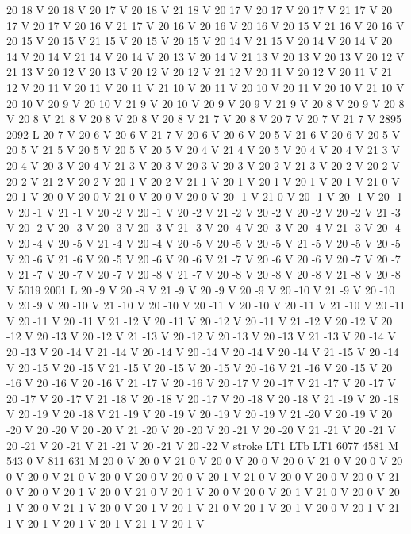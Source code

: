 {{20 18 V
20 18 V
20 17 V
20 18 V
21 18 V
20 17 V
20 17 V
20 17 V
21 17 V
20 17 V
20 17 V
20 16 V
21 17 V
20 16 V
20 16 V
20 16 V
20 15 V
21 16 V
20 16 V
20 15 V
20 15 V
21 15 V
20 15 V
20 15 V
20 14 V
21 15 V
20 14 V
20 14 V
20 14 V
20 14 V
21 14 V
20 14 V
20 13 V
20 14 V
21 13 V
20 13 V
20 13 V
20 12 V
21 13 V
20 12 V
20 13 V
20 12 V
20 12 V
21 12 V
20 11 V
20 12 V
20 11 V
21 12 V
20 11 V
20 11 V
20 11 V
21 10 V
20 11 V
20 10 V
20 11 V
20 10 V
21 10 V
20 10 V
20 9 V
20 10 V
21 9 V
20 10 V
20 9 V
20 9 V
21 9 V
20 8 V
20 9 V
20 8 V
20 8 V
21 8 V
20 8 V
20 8 V
20 8 V
21 7 V
20 8 V
20 7 V
20 7 V
21 7 V
2895 2092 L
20 7 V
20 6 V
20 6 V
21 7 V
20 6 V
20 6 V
20 5 V
21 6 V
20 6 V
20 5 V
20 5 V
21 5 V
20 5 V
20 5 V
20 5 V
20 4 V
21 4 V
20 5 V
20 4 V
20 4 V
21 3 V
20 4 V
20 3 V
20 4 V
21 3 V
20 3 V
20 3 V
20 3 V
20 2 V
21 3 V
20 2 V
20 2 V
20 2 V
21 2 V
20 2 V
20 1 V
20 2 V
21 1 V
20 1 V
20 1 V
20 1 V
20 1 V
21 0 V
20 1 V
20 0 V
20 0 V
21 0 V
20 0 V
20 0 V
20 -1 V
21 0 V
20 -1 V
20 -1 V
20 -1 V
20 -1 V
21 -1 V
20 -2 V
20 -1 V
20 -2 V
21 -2 V
20 -2 V
20 -2 V
20 -2 V
21 -3 V
20 -2 V
20 -3 V
20 -3 V
20 -3 V
21 -3 V
20 -4 V
20 -3 V
20 -4 V
21 -3 V
20 -4 V
20 -4 V
20 -5 V
21 -4 V
20 -4 V
20 -5 V
20 -5 V
20 -5 V
21 -5 V
20 -5 V
20 -5 V
20 -6 V
21 -6 V
20 -5 V
20 -6 V
20 -6 V
21 -7 V
20 -6 V
20 -6 V
20 -7 V
20 -7 V
21 -7 V
20 -7 V
20 -7 V
20 -8 V
21 -7 V
20 -8 V
20 -8 V
20 -8 V
21 -8 V
20 -8 V
5019 2001 L
20 -9 V
20 -8 V
21 -9 V
20 -9 V
20 -9 V
20 -10 V
21 -9 V
20 -10 V
20 -9 V
20 -10 V
21 -10 V
20 -10 V
20 -11 V
20 -10 V
20 -11 V
21 -10 V
20 -11 V
20 -11 V
20 -11 V
21 -12 V
20 -11 V
20 -12 V
20 -11 V
21 -12 V
20 -12 V
20 -12 V
20 -13 V
20 -12 V
21 -13 V
20 -12 V
20 -13 V
20 -13 V
21 -13 V
20 -14 V
20 -13 V
20 -14 V
21 -14 V
20 -14 V
20 -14 V
20 -14 V
20 -14 V
21 -15 V
20 -14 V
20 -15 V
20 -15 V
21 -15 V
20 -15 V
20 -15 V
20 -16 V
21 -16 V
20 -15 V
20 -16 V
20 -16 V
20 -16 V
21 -17 V
20 -16 V
20 -17 V
20 -17 V
21 -17 V
20 -17 V
20 -17 V
20 -17 V
21 -18 V
20 -18 V
20 -17 V
20 -18 V
20 -18 V
21 -19 V
20 -18 V
20 -19 V
20 -18 V
21 -19 V
20 -19 V
20 -19 V
20 -19 V
21 -20 V
20 -19 V
20 -20 V
20 -20 V
20 -20 V
21 -20 V
20 -20 V
20 -21 V
20 -20 V
21 -21 V
20 -21 V
20 -21 V
20 -21 V
21 -21 V
20 -21 V
20 -22 V
stroke
LT1
LTb
LT1
6077 4581 M
543 0 V
811 631 M
20 0 V
20 0 V
21 0 V
20 0 V
20 0 V
20 0 V
21 0 V
20 0 V
20 0 V
20 0 V
21 0 V
20 0 V
20 0 V
20 0 V
20 1 V
21 0 V
20 0 V
20 0 V
20 0 V
21 0 V
20 0 V
20 1 V
20 0 V
21 0 V
20 1 V
20 0 V
20 0 V
20 1 V
21 0 V
20 0 V
20 1 V
20 0 V
21 1 V
20 0 V
20 1 V
20 1 V
21 0 V
20 1 V
20 1 V
20 0 V
20 1 V
21 1 V
20 1 V
20 1 V
20 1 V
21 1 V
20 1 V
}}
